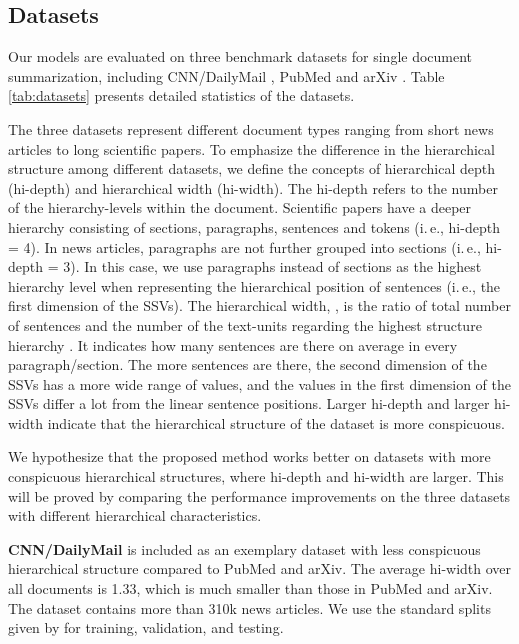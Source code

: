 \documentclass[11pt]{article}
\begin{document}
\subsection{Datasets}
\label{subsec:datasets}

Our models are evaluated on three benchmark datasets for single document summarization, including CNN/DailyMail \cite{cnndm}, PubMed and arXiv \cite{pubmed}. Table \ref{tab:datasets} presents detailed statistics of the datasets.


The three datasets represent different document types ranging from short news articles to long scientific papers. To emphasize the difference in the hierarchical structure among different datasets, we define the concepts of hierarchical depth (hi-depth) and hierarchical width (hi-width). The hi-depth refers to the number of the hierarchy-levels within the document. Scientific papers have a deeper hierarchy consisting of sections, paragraphs, sentences and tokens (i.\,e., hi-depth = 4). In news articles, paragraphs are not further grouped into sections (i.\,e., hi-depth = 3). In this case, we use paragraphs instead of sections as the highest hierarchy level when representing the hierarchical position of sentences (i.\,e.,  the first dimension of the SSVs).
The hierarchical width, , is the ratio of total number of sentences  and the number of the text-units regarding the highest structure hierarchy . 
It indicates how many sentences are there on average in every paragraph/section. The more sentences are there, the second dimension of the SSVs has a more wide range of values, and the values in the first dimension of the SSVs differ a lot from the linear sentence positions. Larger hi-depth and larger hi-width indicate that the hierarchical structure of the dataset is more conspicuous.

We hypothesize that the proposed method works better on datasets with more conspicuous hierarchical structures, where hi-depth and hi-width are larger. This will be proved by comparing the performance improvements on the three datasets with different hierarchical characteristics. 

\textbf{CNN/DailyMail} is included as an exemplary dataset with less conspicuous hierarchical structure compared to PubMed and arXiv. The average hi-width over all documents is 1.33, which is much smaller than those in PubMed and arXiv. The dataset contains more than 310k news articles. We use the standard splits given by \citet{cnndm} for training, validation, and testing. 
\end{document}

